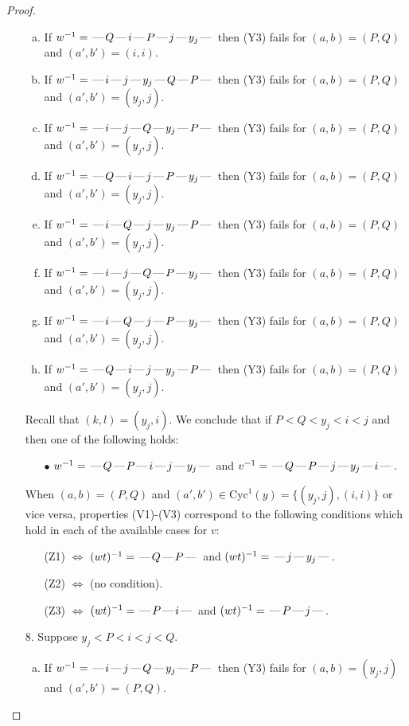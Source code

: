 \documentclass[10pt]{article}
\theoremstyle{definition}
\theoremstyle{definition}
\def\dash{\text{\hspace{0.5mm}---\hspace{0.5mm}}}
\def\Cyc{\mathrm{Cyc}}
\begin{document}
\begin{proof}
\begin{enumerate}
\begin{enumerate}[(a)]
\item If $w^{-1} = \dash Q\dash i\dash P\dash j\dash y_j\dash $ then (Y3) fails for $(a,b)=(P,Q)$ and $(a',b')=(i,i)$.
\item If $w^{-1} = \dash i\dash j\dash y_j\dash Q\dash P\dash $ then (Y3) fails for $(a,b)=(P,Q)$ and $(a',b')=(y_j,j)$.
\item If $w^{-1} = \dash i\dash j\dash Q\dash y_j\dash P\dash $ then (Y3) fails for $(a,b)=(P,Q)$ and $(a',b')=(y_j,j)$.
\item If $w^{-1} = \dash Q\dash i\dash j\dash P\dash y_j\dash $ then (Y3) fails for $(a,b)=(P,Q)$ and $(a',b')=(y_j,j)$.
\item If $w^{-1} = \dash i\dash Q\dash j\dash y_j\dash P\dash $ then (Y3) fails for $(a,b)=(P,Q)$ and $(a',b')=(y_j,j)$.
\item If $w^{-1} = \dash i\dash j\dash Q\dash P\dash y_j\dash $ then (Y3) fails for $(a,b)=(P,Q)$ and $(a',b')=(y_j,j)$.
\item If $w^{-1} = \dash i\dash Q\dash j\dash P\dash y_j\dash $ then (Y3) fails for $(a,b)=(P,Q)$ and $(a',b')=(y_j,j)$.
\item If $w^{-1} = \dash Q\dash i\dash j\dash y_j\dash P\dash $ then (Y3) fails for $(a,b)=(P,Q)$ and $(a',b')=(y_j,j)$.
\end{enumerate}
Recall that $(k,l) = (y_j,i)$.
We conclude that if $P < Q < y_j < i < j$ and then one of the following holds:
\begin{enumerate}
\item[$\bullet$] $w^{-1} = \dash Q\dash P\dash i\dash j\dash y_j\dash $ and $v^{-1} = \dash Q\dash P\dash j\dash y_j\dash i\dash $.
\end{enumerate}
When $(a,b)= (P,Q)$ and $(a',b')\in \Cyc^1(y)=\{(y_j,j),(i,i)\}$ or vice versa,
properties (V1)-(V3) correspond to the following conditions which hold in
each of the available cases for $v$:
\begin{enumerate}
\item[](Z1) $\Leftrightarrow$ $(wt)^{-1} = \dash Q \dash P \dash$  and $(wt)^{-1} = \dash j \dash y_j \dash$.
\item[](Z2) $\Leftrightarrow$ (no condition).
\item[](Z3) $\Leftrightarrow$ $(wt)^{-1} = \dash P \dash i \dash$  and $(wt)^{-1} = \dash P \dash j \dash$.
\end{enumerate}
\item[$8$.] Suppose $y_j < P < i < j < Q$.
\begin{enumerate}[(a)]
\item If $w^{-1} = \dash i\dash j\dash Q\dash y_j\dash P\dash $ then (Y3) fails for $(a,b)=(y_j,j)$ and $(a',b')=(P,Q)$.

\end{enumerate}
\end{enumerate}
\end{proof}
\end{document}
